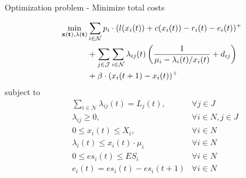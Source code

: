 \documentclass[xcolor=dvipsnames]{beamer}
\begin{document}
\begin{frame}{Optimization problem - Minimize total costs}

\begin{align*}
\min_{\bf{x}(t), \bf{\lambda}(t)} & \sum_{i \in \mathcal{N}} p_i \cdot (l(x_i(t)) + c(x_i(t)) - r_i(t) - e_i(t))^+ \\
& + \sum_{j \in \mathcal{J}}\sum_{i \in \mathcal{N}}
\lambda_{ij}(t)\left(\frac{1}{\mu_i - \lambda_i(t)/x_i(t)} + d_{ij}\right) \\
& + \beta \cdot (x_i(t+1) - x_i(t))^+
\end{align*}
\vspace{-2mm}
subject to
\begin{align*}
& \sum_{i\in \mathcal{N}}\lambda_{ij}(t) = L_j(t), &\forall j\in J \\
& \lambda_{ij} \geq 0, & \forall i\in N, j\in J \\
& 0 \leq x_i(t) \leq X_i, & \forall i \in N \\
& \lambda_i(t) \leq x_i(t) \cdot \mu_i & \forall i \in N \\
& 0 \leq es_i(t) \leq ES_i & \forall i \in N \\
& e_i(t) = es_i(t) - es_i(t+1) & \forall i \in N
\end{align*}

\end{frame}
\end{document}
